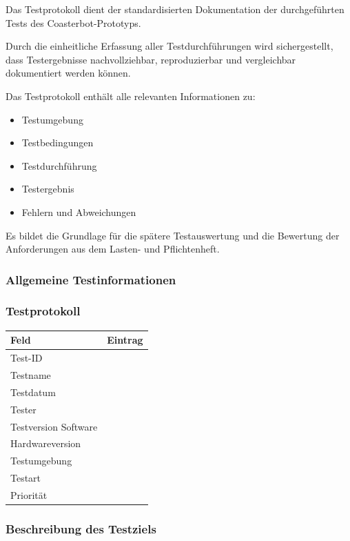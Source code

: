 \documentclass[
  a4paper,
  12pt,
  DIV=12,        %
  parskip=half,  %
  headings=small %
]{scrartcl}
\theoremstyle{definition}
\providecommand{\tightlist}{%
  \setlength{\itemsep}{0pt}\setlength{\parskip}{0pt}}
\theoremstyle{definition}
\begin{document}
Das Testprotokoll dient der standardisierten Dokumentation der
durchgeführten Tests des Coasterbot-Prototyps.

Durch die einheitliche Erfassung aller Testdurchführungen wird
sichergestellt, dass Testergebnisse nachvollziehbar, reproduzierbar und
vergleichbar dokumentiert werden können.

Das Testprotokoll enthält alle relevanten Informationen zu:

\begin{itemize}
\tightlist
\item
  Testumgebung
\item
  Testbedingungen
\item
  Testdurchführung
\item
  Testergebnis
\item
  Fehlern und Abweichungen
\end{itemize}

Es bildet die Grundlage für die spätere Testauswertung und die Bewertung
der Anforderungen aus dem Lasten- und Pflichtenheft.

\subsubsection{Allgemeine
Testinformationen}\label{allgemeine-testinformationen}

\subsubsection{Testprotokoll}\label{testprotokoll}

\begin{longtable}[]{@{}ll@{}}
\toprule\noalign{}
Feld & Eintrag \\
\midrule\noalign{}
\endhead
\bottomrule\noalign{}
\endlastfoot
Test-ID & \\
Testname & \\
Testdatum & \\
Tester & \\
Testversion Software & \\
Hardwareversion & \\
Testumgebung & \\
Testart & \\
Priorität & \\
\end{longtable}

\subsubsection{Beschreibung des
Testziels}\label{beschreibung-des-testziels}
\end{document}
